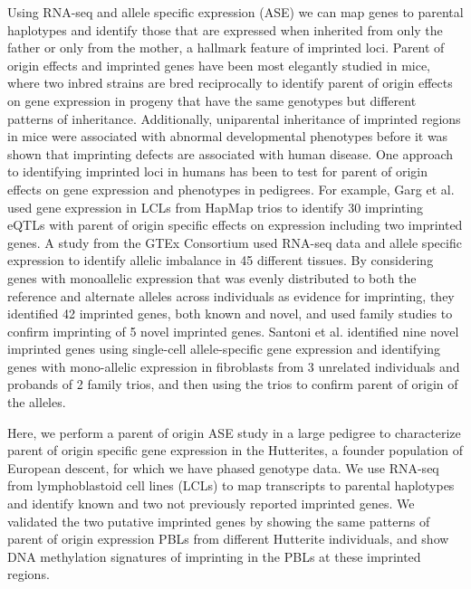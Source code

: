 Using RNA-seq and allele specific expression (ASE) we can map genes to parental haplotypes and identify those that are expressed when inherited from only the father or only from the mother, a hallmark feature of imprinted loci. Parent of origin effects and imprinted genes have been most elegantly studied in mice, where two inbred strains are bred reciprocally to identify parent of origin effects on gene expression in progeny that have the same genotypes but different patterns of inheritance\cite{Babak2015}. Additionally, uniparental inheritance of imprinted regions in mice were associated with abnormal developmental phenotypes\cite{Cattanach:1985hu} before it was shown that imprinting defects are associated with human disease\cite{Nicholls:vh}. One approach to identifying imprinted loci in humans has been to test for parent of origin effects on gene expression and phenotypes in pedigrees\cite{Kong:2009kk,Benonisdottir:2016dz}. For example, Garg et al. used gene expression in LCLs from HapMap trios to identify 30 imprinting eQTLs with parent of origin specific effects on expression including two imprinted genes\cite{Garg2012a}. A study from the GTEx Consortium used RNA-seq data and allele specific expression to identify allelic imbalance in 45 different tissues. By considering genes with monoallelic expression that was evenly distributed to both the reference and alternate alleles across individuals as evidence for imprinting, they identified 42 imprinted genes, both known and novel, and used family studies to confirm imprinting of 5 novel imprinted genes\cite{Baran:2015cx}. Santoni et al. identified nine novel imprinted genes using single-cell allele-specific gene expression and identifying genes with mono-allelic expression in fibroblasts from 3 unrelated individuals and probands of 2 family trios, and then using the trios to confirm parent of origin of the alleles\cite{Santoni:2017hu}.

Here, we perform a parent of origin ASE study in a large pedigree to characterize parent of origin specific gene expression in the Hutterites, a founder population of European descent, for which we have phased genotype data\cite{Livne2015}. We use RNA-seq from lymphoblastoid cell lines (LCLs) to map transcripts to parental haplotypes and identify known and two not previously reported imprinted genes. We validated the two putative imprinted genes by showing the same patterns of parent of origin expression PBLs from different Hutterite individuals, and show DNA methylation signatures of imprinting in the PBLs at these imprinted regions.
	
